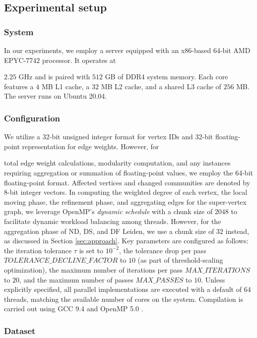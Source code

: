 \subsection{Experimental setup}
\label{sec:setup}

\subsubsection{System}
\label{sec:system}

In our experiments, we employ a server equipped with an x86-based 64-bit AMD EPYC-7742 processor. It operates at $2.25$ GHz and is paired with $512$ GB of DDR4 system memory. Each core features a $4$ MB L1 cache, a $32$ MB L2 cache, and a shared L3 cache of $256$ MB. The server runs on Ubuntu 20.04.


\subsubsection{Configuration}
\label{sec:configuration}

We utilize a 32-bit unsigned integer format for vertex IDs and 32-bit floating-point representation for edge weights. However, for total edge weight calculations, modularity computation, and any instances requiring aggregation or summation of floating-point values, we employ the 64-bit floating-point format. Affected vertices and changed communities are denoted by 8-bit integer vectors. In computing the weighted degree of each vertex, the local moving phase, the refinement phase, and aggregating edges for the super-vertex graph, we leverage OpenMP's \textit{dynamic schedule} with a chunk size of $2048$ to facilitate dynamic workload balancing among threads. However, for the aggregation phase of ND, DS, and DF Leiden, we use a chunk size of $32$ instead, as discussed in Section \ref{sec:approach}. Key parameters are configured as follows: the iteration tolerance $\tau$ is set to $10^{-2}$, the tolerance drop per pass $TOLERANCE\_DECLINE\_FACTOR$ to $10$ (as part of threshold-scaling optimization), the maximum number of iterations per pass $MAX\_ITERATIONS$ to $20$, and the maximum number of passes $MAX\_PASSES$ to $10$. Unless explicitly specified, all parallel implementations are executed with a default of $64$ threads, matching the available number of cores on the system. Compilation is carried out using GCC 9.4 and OpenMP 5.0 \cite{openmp18}.


\subsubsection{Dataset}
\label{sec:dataset}

